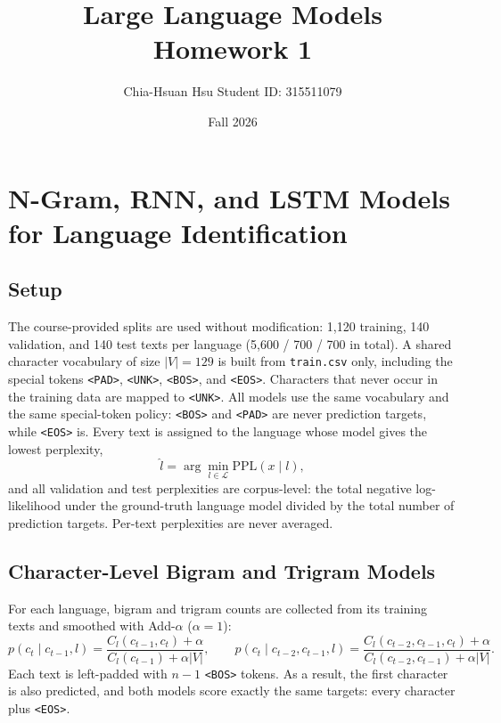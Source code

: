 \documentclass[11pt,a4paper]{article}
\title{Large Language Models\\
Homework 1}
\author{Chia-Hsuan Hsu \quad Student ID: 315511079}
\date{Fall 2026}
\begin{document}
\maketitle


\section{N-Gram, RNN, and LSTM Models for Language Identification}

\subsection{Setup}

The course-provided splits are used without modification: 1,120
training, 140 validation, and 140 test texts per language (5,600 / 700 /
700 in total). A shared character vocabulary of size $|V|=129$ is built
from \texttt{train.csv} only, including the special tokens
\texttt{<PAD>}, \texttt{<UNK>}, \texttt{<BOS>}, and \texttt{<EOS>}.
Characters that never occur in the training data are mapped to
\texttt{<UNK>}. All models use the same vocabulary and the same
special-token policy: \texttt{<BOS>} and \texttt{<PAD>} are never
prediction targets, while \texttt{<EOS>} is. Every text is assigned to
the language whose model gives the lowest perplexity,
\[
\hat{l}=\arg\min_{l\in\mathcal{L}}\mathrm{PPL}(x\mid l),
\]
and all validation and test perplexities are corpus-level: the total
negative log-likelihood under the ground-truth language model divided by
the total number of prediction targets. Per-text perplexities are never
averaged.


\subsection{Character-Level Bigram and Trigram Models}

For each language, bigram and trigram counts are collected from its
training texts and smoothed with Add-$\alpha$ ($\alpha=1$):
\[
p(c_t\mid c_{t-1},l)=\frac{C_l(c_{t-1},c_t)+\alpha}{C_l(c_{t-1})+\alpha|V|},\qquad
p(c_t\mid c_{t-2},c_{t-1},l)=\frac{C_l(c_{t-2},c_{t-1},c_t)+\alpha}{C_l(c_{t-2},c_{t-1})+\alpha|V|}.
\]
Each text is left-padded with $n-1$ \texttt{<BOS>} tokens. As a result,
the first character is also predicted, and both models score exactly the
same targets: every character plus \texttt{<EOS>}.
\end{document}
